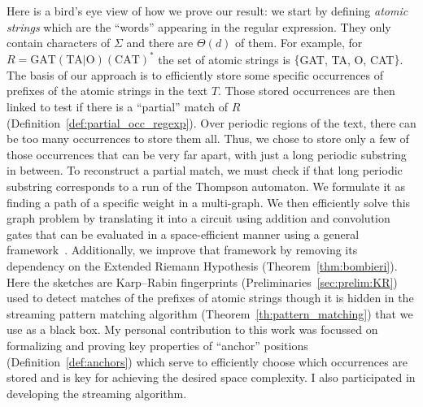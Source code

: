 Here is a bird's eye view of how we prove our result: we start by defining \emph{atomic strings} which are the ``words'' appearing in the regular expression. They only contain characters of $\Sigma$ and there are $\Theta(d)$ of them. For example, for $R= \mathrm{GAT}(\mathrm{TA} | \mathrm{O})(\mathrm{CAT})^*$  the set of atomic strings is $\{$GAT, TA, O, CAT$\}$.
%
The basis of our approach is to efficiently store some specific occurrences of prefixes of the atomic strings in the text $T$. Those stored occurrences are then linked to test if there is a “partial” match of $R$ (Definition~\ref*{def:partial_occ_regexp}).
Over periodic regions of the text, there can be too many occurrences to store them all.
Thus, we chose to store only a few of those occurrences that can be very far apart, with just a long periodic substring in between. To reconstruct a partial match, we must check if that long periodic substring corresponds to a run of the Thompson automaton. We formulate it as finding a path of a specific weight in a multi-graph. We then efficiently solve this graph problem by translating it into a circuit using addition and convolution gates that can be evaluated in a space-efficient manner using a general framework~\cite{LokshtanovN10,Bringmann17}. Additionally, we improve that framework by removing its dependency on the Extended Riemann Hypothesis (Theorem~\ref{thm:bombieri}). 
Here the sketches are Karp--Rabin fingerprints (Preliminaries~\ref{sec:prelim:KR}) used to detect matches of the prefixes of atomic strings though it is hidden in the streaming pattern matching algorithm (Theorem~\ref{th:pattern_matching}) that we use as a black box.
My personal contribution to this work was focussed on formalizing and proving key properties of ``anchor'' positions (Definition~\ref{def:anchors}) which serve to efficiently choose which occurrences are stored and is key for achieving the desired space complexity. I also participated in developing the streaming algorithm. %



